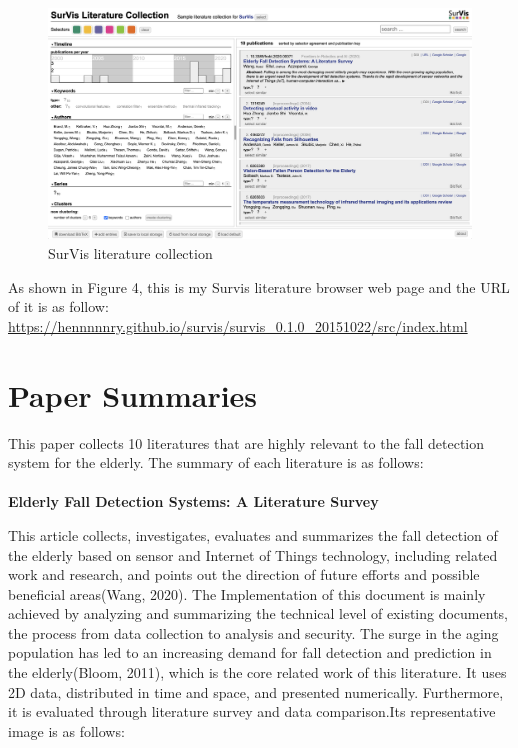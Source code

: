 \documentclass[12pt]{article}
\begin{document}
\begin{figure}[H]
\centering
\includegraphics[width=1\textwidth]{survis.pic.jpg}
\caption{SurVis literature collection} 
\end{figure}

\noindent As shown in Figure 4, this is my Survis literature browser web page and the URL of it is as follow:
\url{https://hennnnnry.github.io/survis/survis_0.1.0_20151022/src/index.html}

\section{Paper Summaries}

This paper collects 10 literatures that are highly relevant to the fall detection system for the elderly. The summary of each literature is as follows:
\\ \hspace*{\fill} \\
\textbf{Elderly Fall Detection Systems: A Literature Survey}

\noindent This article collects, investigates, evaluates and summarizes the fall detection of the elderly based on sensor and Internet of Things technology, including related work and research, and points out the direction of future efforts and possible beneficial areas(Wang, 2020). The Implementation of this document is mainly achieved by analyzing and summarizing the technical level of existing documents, the process from data collection to analysis and security. The surge in the aging population has led to an increasing demand for fall detection and prediction in the elderly(Bloom, 2011), which is the core related work of this literature. It uses 2D data, distributed in time and space, and presented numerically. Furthermore, it is evaluated through literature survey and data comparison.Its representative image is as follows:
\end{document}

